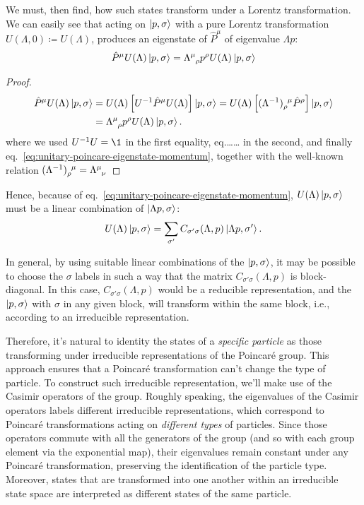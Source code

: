 We must, then find, how such states transform under a Lorentz transformation. We can easily see that acting on $\ket{p,\sigma}$ with a pure Lorentz transformation $U(\Lambda,0) \coloneq U(\Lambda)$, produces an eigenstate of $\hat{P}^\mu$ of eigenvalue $\Lambda p$:
\begin{equation}
    \hat{P}^\mu U(\Lambda) \ket{p,\sigma} = \tensor{\Lambda}{^\mu_\rho} p^\rho U(\Lambda) \ket{p,\sigma}
\end{equation}
\begin{proof}
    \begin{equation*}
    \begin{split}
        \hat{P}^\mu U(\Lambda) \ket{p,\sigma} &= U(\Lambda) \left[U^{-1} \hat{P}^\mu U(\Lambda)\right] \ket{p,\sigma} = U(\Lambda) \left[ \tensor{(\Lambda^{-1})}{_\rho^\mu} \hat{P}^\rho \right] \ket{p,\sigma}  \\
        &= \tensor{\Lambda}{^\mu_\rho} p^\rho U(\Lambda) \ket{p,\sigma} .
    \end{split}
    \end{equation*}
    where we used $U^{-1}U=\1$ in the first equality, eq.\color{red}\dots\dots\color{black} in the second, and finally eq.~\eqref{eq:unitary-poincare-eigenstate-momentum}, together with the well-known relation $\tensor{(\Lambda^{-1})}{_\rho^\mu} = \tensor{\Lambda}{^\mu_\nu}$
\end{proof}

Hence, because of eq.~\eqref{eq:unitary-poincare-eigenstate-momentum}, $U(\Lambda)\ket{p,\sigma}$ must be a linear combination of $\ket{\Lambda p,\sigma}$:
\begin{equation}\label{eq:temp-1}
    U(\Lambda)\ket{p,\sigma} =  \sum_{\sigma'} C_{\sigma' \sigma} (\Lambda, p) \ket{\Lambda p,\sigma'}.
\end{equation}

In general, by using suitable linear combinations of the $\ket{p,\sigma}$, it may be possible to choose the $\sigma$ labels in such a way that the matrix $C_{\sigma' \sigma} (\Lambda, p)$ is block-diagonal. In this case, $C_{\sigma' \sigma} (\Lambda, p)$ would be a reducible representation, and the $\ket{p,\sigma}$ with $\sigma$ in any given block, will transform within the same block, i.e., according to an irreducible representation. 

Therefore, it's natural to identity the states of a \emph{specific particle} as those transforming under irreducible representations of the Poincaré group. This approach ensures that a Poincaré transformation can't change the type of particle. To construct such irreducible representation, we'll make use of the Casimir operators of the group. Roughly speaking, the eigenvalues of the Casimir operators labels different irreducible representations, which correspond to Poincaré transformations acting on \emph{different types} of particles. Since those operators commute with all the generators of the group (and so with each group element via the exponential map), their eigenvalues remain constant under any Poincaré transformation, preserving the identification of the particle type. Moreover, states that are transformed into one another within an irreducible state space are interpreted as different states of the same particle.

